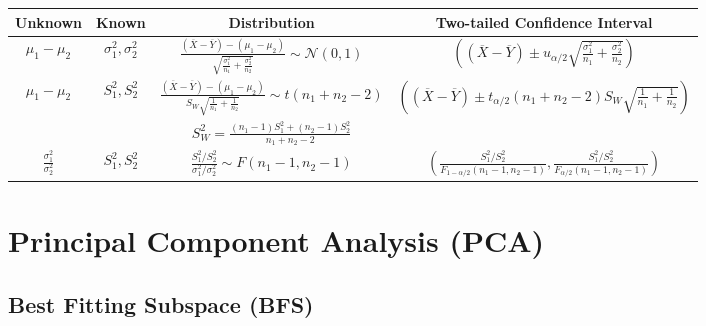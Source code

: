 \documentclass{article}
\begin{document}
\begin{center}
\begin{tabular}{|c|c|c|c|}
\hline
\textbf{Unknown} & \textbf{Known} & \textbf{Distribution} & \textbf{Two-tailed Confidence Interval} \\
\hline
$\mu_1 - \mu_2$ & $\sigma_1^2, \sigma_2^2$ & $\frac{(\overline{X} - \overline{Y}) - (\mu_1 - \mu_2)}{\sqrt{\frac{\sigma_1^2}{n_1} + \frac{\sigma_2^2}{n_2}}} \sim \mathcal{N}(0,1)$ & $\left((\overline{X} - \overline{Y}) \pm u_{\alpha/2}\sqrt{\frac{\sigma_1^2}{n_1} + \frac{\sigma_2^2}{n_2}}\right)$ \\
\hline
$\mu_1 - \mu_2$ & $S_1^2, S_2^2$ & $\frac{(\overline{X} - \overline{Y}) - (\mu_1 - \mu_2)}{S_W\sqrt{\frac{1}{n_1} + \frac{1}{n_2}}} \sim t(n_1 + n_2 - 2)$ & $\left((\overline{X} - \overline{Y}) \pm t_{\alpha/2}(n_1 + n_2 - 2) S_W\sqrt{\frac{1}{n_1} + \frac{1}{n_2}}\right)$ \\
& & $S_W^2 = \frac{(n_1-1)S_1^2 + (n_2-1)S_2^2}{n_1 + n_2 - 2}$ & \\
\hline
$\frac{\sigma_1^2}{\sigma_2^2}$ & $S_1^2, S_2^2$ & $\frac{S_1^2/S_2^2}{\sigma_1^2/\sigma_2^2} \sim F(n_1-1, n_2-1)$ & $\left(\frac{S_1^2/S_2^2}{F_{1-\alpha/2}(n_1-1, n_2-1)}, \frac{S_1^2/S_2^2}{F_{\alpha/2}(n_1-1, n_2-1)}\right)$ \\
\hline
\end{tabular}
\end{center}


\newpage
\section{Principal Component Analysis (PCA)}

\subsection{Best Fitting Subspace (BFS)}
\end{document}
